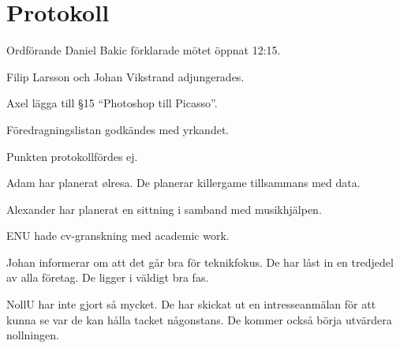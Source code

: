 \documentclass[10pt]{article}
\def\mo{Daniel Bakic}
\begin{document}
\section*{Protokoll}
\begin{paragrafer}
	Ordförande {\mo} förklarade mötet öppnat 12:15.

	{\valavmo}

	{\valavms}

	{\valavj}

	{\tosg}

	Filip Larsson och Johan Vikstrand adjungerades.

	
	Axel \ypa lägga till \S15 ``Photoshop till Picasso''.

	Föredragningslistan godkändes med yrkandet.

	\ingaprot

	\begin{fyllnadsval} %
	\end{fyllnadsval}

	\begin{paragrafer}
		Punkten protokollfördes ej.


		Adam har planerat ølresa. De planerar killergame tillsammans med data.

		Alexander har planerat en sittning i samband med musikhjälpen.

		ENU hade cv-granskning med academic work.

		Johan informerar om att det går bra för teknikfokus. De har låst in en tredjedel av alla företag. De ligger i väldigt bra fas. 

		NollU har inte gjort så mycket. De har skickat ut en intresseanmälan för att kunna se var de kan hålla tacket någonstans. De kommer också börja utvärdera nollningen. 


\end{paragrafer}
\end{paragrafer}
\end{document}
